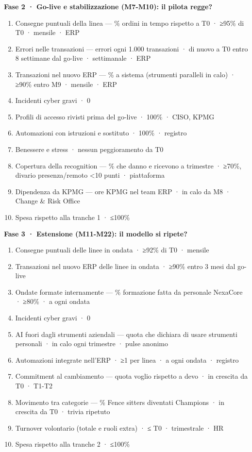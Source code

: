 \documentclass[11pt,a4paper]{article}
\begin{document}
\textbf{Fase 2 · Go-live e stabilizzazione (M7-M10): il pilota regge?}
\begin{enumerate}
\item Consegne puntuali della linea — \% ordini in tempo rispetto a T0 · ≥95\% di T0 · mensile · ERP
\item Errori nelle transazioni — errori ogni 1.000 transazioni · di nuovo a T0 entro 8 settimane dal go-live · settimanale · ERP
\item Transazioni nel nuovo ERP — \% a sistema (strumenti paralleli in calo) · ≥90\% entro M9 · mensile · ERP
\item Incidenti cyber gravi · 0
\item Profili di accesso rivisti prima del go-live · 100\% · CISO, KPMG
\item Automazioni con istruzioni e sostituto · 100\% · registro
\item Benessere e stress · nessun peggioramento da T0
\item Copertura della recognition — \% che danno e ricevono a trimestre · ≥70\%, divario presenza/remoto <10 punti · piattaforma
\item Dipendenza da KPMG — ore KPMG nel team ERP · in calo da M8 · Change \& Risk Office
\item Spesa rispetto alla tranche 1 · ≤100\%
\end{enumerate}

\textbf{Fase 3 · Estensione (M11-M22): il modello si ripete?}
\begin{enumerate}
\item Consegne puntuali delle linee in ondata · ≥92\% di T0 · mensile
\item Transazioni nel nuovo ERP delle linee in ondata · ≥90\% entro 3 mesi dal go-live
\item Ondate formate internamente — \% formazione fatta da personale NexaCore · ≥80\% · a ogni ondata
\item Incidenti cyber gravi · 0
\item AI fuori dagli strumenti aziendali — quota che dichiara di usare strumenti personali · in calo ogni trimestre · pulse anonimo
\item Automazioni integrate nell'ERP · ≥1 per linea · a ogni ondata · registro
\item Commitment al cambiamento — quota \guillemotleft{}voglio\guillemotright{} rispetto a \guillemotleft{}devo\guillemotright{} · in crescita da T0 · T1-T2
\item Movimento tra categorie — \% Fence sitters diventati Champions · in crescita da T0 · trivia ripetuto
\item Turnover volontario (totale e ruoli extra) · ≤ T0 · trimestrale · HR
\item Spesa rispetto alla tranche 2 · ≤100\%
\end{enumerate}
\end{document}
